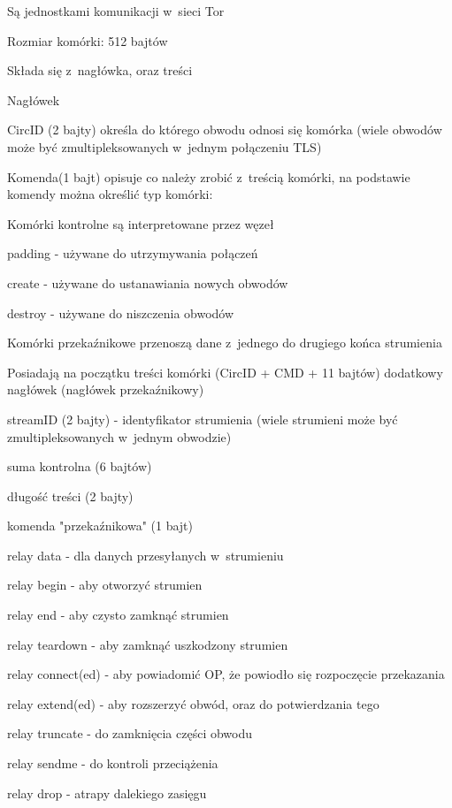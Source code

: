    \begin{description}
    \item Są jednostkami komunikacji w~sieci Tor
    \item Rozmiar komórki: 512 bajtów
    \item Składa się z~nagłówka, oraz treści
    \item Nagłówek
    \begin{description}
     \item CircID (2 bajty) określa do którego obwodu odnosi się komórka (wiele obwodów może być zmultipleksowanych w~jednym połączeniu TLS)
     \item Komenda(1 bajt) opisuje co należy zrobić z~treścią komórki, na podstawie komendy można określić typ komórki:
     \begin{description}
      \item Komórki kontrolne są interpretowane przez węzeł
      \begin{description}
       \item padding - używane do utrzymywania połączeń
       \item create - używane do ustanawiania nowych obwodów
       \item destroy - używane do niszczenia obwodów
      \end{description}

      \item Komórki przekaźnikowe przenoszą dane z~jednego do drugiego końca strumienia
      \begin{description}
       \item Posiadają na początku treści komórki (CircID + CMD + 11 bajtów) dodatkowy nagłówek (nagłówek przekaźnikowy)
       \begin{description}
	\item streamID (2 bajty) - identyfikator strumienia (wiele strumieni może być zmultipleksowanych w~jednym obwodzie)
	\item suma kontrolna (6 bajtów)
	\item długość treści (2 bajty)
	\item komenda "przekaźnikowa" (1 bajt)
	\begin{description}
	 \item relay data - dla danych przesyłanych w~strumieniu
	 \item relay begin - aby otworzyć strumien
	 \item relay end - aby czysto zamknąć strumien
	 \item relay teardown - aby zamknąć uszkodzony strumien
	 \item relay connect(ed) - aby powiadomić OP, że powiodło się rozpoczęcie przekazania
	 \item relay extend(ed) - aby rozszerzyć obwód, oraz do potwierdzania tego
	 \item relay truncate - do zamknięcia części obwodu
	 \item relay sendme - do kontroli przeciążenia
	 \item relay drop - atrapy dalekiego zasięgu
	\end{description}


\end{description}
\end{description}
\end{description}
\end{description}
\end{description}
